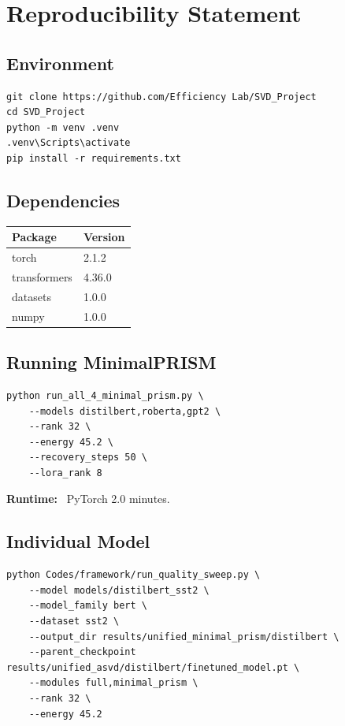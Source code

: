 
\section{Reproducibility Statement}

\subsection{Environment}

\begin{lstlisting}
git clone https://github.com/Efficiency Lab/SVD_Project
cd SVD_Project
python -m venv .venv
.venv\Scripts\activate
pip install -r requirements.txt
\end{lstlisting}

\subsection{Dependencies}

\begin{table}[H]
\centering
\small
\begin{tabular}{ll}
\toprule
\textbf{Package} & \textbf{Version} \\
\midrule
torch & 2.1.2 \\
transformers & 4.36.0 \\
datasets & 1.0.0 \\
numpy & 1.0.0 \\
\bottomrule
\end{tabular}
\end{table}

\subsection{Running MinimalPRISM}

\begin{lstlisting}
python run_all_4_minimal_prism.py \
    --models distilbert,roberta,gpt2 \
    --rank 32 \
    --energy 45.2 \
    --recovery_steps 50 \
    --lora_rank 8
\end{lstlisting}

\textbf{Runtime:} ~PyTorch 2.0 minutes.

\subsection{Individual Model}

\begin{lstlisting}
python Codes/framework/run_quality_sweep.py \
    --model models/distilbert_sst2 \
    --model_family bert \
    --dataset sst2 \
    --output_dir results/unified_minimal_prism/distilbert \
    --parent_checkpoint results/unified_asvd/distilbert/finetuned_model.pt \
    --modules full,minimal_prism \
    --rank 32 \
    --energy 45.2
\end{lstlisting}

